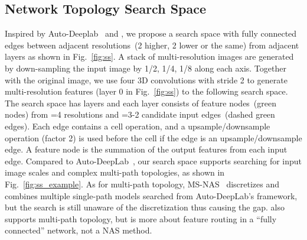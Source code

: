 \documentclass[final]{cvpr}
\begin{document}
\subsection{Network Topology Search Space}
Inspired by Auto-Deeplab~\cite{liu2019auto} and \cite{li2020learning}, we propose a search space with fully connected edges between adjacent resolutions~(2 higher, 2 lower or the same) from adjacent layers as shown in Fig.~\ref{fig:ss}. A stack of multi-resolution images are generated by down-sampling the input image by 1/2, 1/4, 1/8 along each axis. Together with the original image, we use four  3D convolutions with stride 2 to generate multi-resolution features (layer 0 in Fig.~\ref{fig:ss}) to the following search space. The search space has  layers and each layer consists of feature nodes~(green nodes) from =4 resolutions and =3-2 candidate input edges~(dashed green edges). Each edge contains a cell operation, and a upsample/downsample operation (factor 2) is used before the cell if the edge is an upsample/downsample edge. A feature node is the summation of the output features from each input edge. Compared to Auto-DeepLab~\cite{liu2019auto}, our search space supports searching for input image scales and complex multi-path topologies, as shown in Fig.~\ref{fig:ss_example}. As for multi-path topology, MS-NAS~\cite{yan2020ms} discretizes and combines multiple single-path models searched from Auto-DeepLab's framework, but the search is still unaware of the discretization thus causing the gap. \cite{li2020learning} also supports multi-path topology, but \cite{li2020learning} is more about feature routing in a ``fully connected'' network, not a NAS method.
\end{document}
